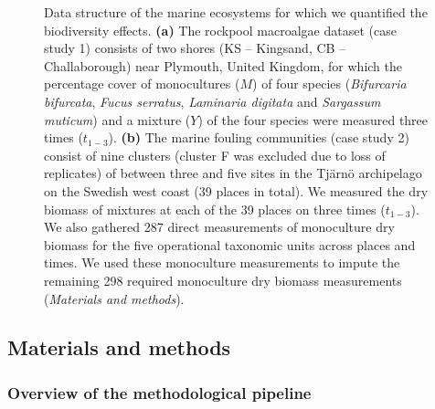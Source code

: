 \documentclass[
  letterpaper,
  DIV=11,
  numbers=noendperiod]{scrartcl}
\begin{document}
\begin{figure}


\caption{\label{fig-m2}Data structure of the marine ecosystems for which
we quantified the biodiversity effects. \textbf{(a)} The rockpool
macroalgae dataset (case study 1) consists of two shores (KS --
Kingsand, CB -- Challaborough) near Plymouth, United Kingdom, for which
the percentage cover of monocultures (\(M\)) of four species
(\emph{Bifurcaria bifurcata}, \emph{Fucus serratus}, \emph{Laminaria
digitata} and \emph{Sargassum muticum}) and a mixture (\(Y\)) of the
four species were measured three times (\(t_{1-3}\)). \textbf{(b)} The
marine fouling communities (case study 2) consist of nine clusters
(cluster F was excluded due to loss of replicates) of between three and
five sites in the Tjärnö archipelago on the Swedish west coast (39
places in total). We measured the dry biomass of mixtures at each of the
39 places on three times (\(t_{1-3}\)). We also gathered 287 direct
measurements of monoculture dry biomass for the five operational
taxonomic units across places and times. We used these monoculture
measurements to impute the remaining 298 required monoculture dry
biomass measurements (\emph{Materials and methods}).}

\end{figure}%

\subsection{Materials and methods}\label{materials-and-methods}

\subsubsection{Overview of the methodological
pipeline}\label{overview-of-the-methodological-pipeline}
\end{document}
